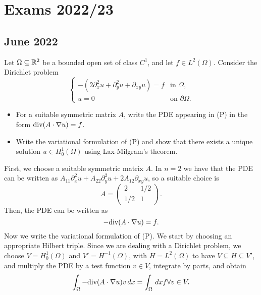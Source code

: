 \section{Exams 2022/23}
\subsection{June 2022}
\begin{exercise}
    Let \(\Omega \subseteq \mathbb{R}^2\) be a bounded open set of class \(C^1\), and let \(f \in L^2(\Omega)\). Consider the Dirichlet problem
    \begin{equation*}
        \begin{cases}
            -\left(2\partial_{x}^2 u + \partial_{y}^2 u + \partial_{xy} u\right) = f & \text{in } \Omega,          \\
            u = 0                                                                    & \text{on } \partial \Omega.
        \end{cases}
        \tag*{(P)}
    \end{equation*}
    \begin{itemize}
        \item For a suitable symmetric matrix \(A\), write the PDE appearing in (P) in the
              form \(\text{div}(A \cdot \nabla u) = f\).
        \item Write the variational formulation of (P) and show that there exists a unique
              solution \(u \in H_0^1(\Omega)\) using Lax-Milgram's theorem.
    \end{itemize}
\end{exercise}
First, we choose a suitable symmetric matrix \(A\). In \(n = 2\) we have that the PDE can be written as \(A_{11} \partial_{x}^2 u + A_{22} \partial_{y}^2 u + 2A_{12} \partial_{xy} u\), so a suitable choice is
\[
    A = \begin{pmatrix}
        2   & 1/2 \\
        1/2 & 1
    \end{pmatrix}.
\]
Then, the PDE can be written as
\[
    - \text{div}(A \cdot \nabla u) = f.
\]
Now we write the variational formulation of (P). We start by choosing an
appropriate Hilbert triple. Since we are dealing with a Dirichlet problem, we
choose \(V = H_0^1(\Omega)\) and \(V' = H^{-1}(\Omega)\), with \(H =
L^2(\Omega)\) to have \(V \subseteq H \subseteq V'\), and multiply the PDE by a
test function \(v \in V\), integrate by parts, and obtain
\[
    \int_{\Omega} - \text{div}(A \cdot \nabla u) v \, dx = \int_{\Omega} \, dx f \forall v \in V.
\]
